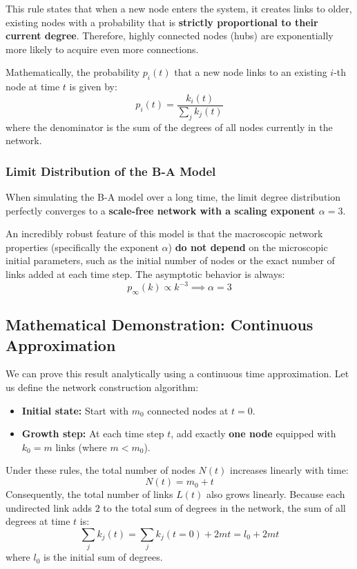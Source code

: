 This rule states that when a new node enters the system, it creates links to older, existing nodes with a probability that is \textbf{strictly proportional to their current degree}. Therefore, highly connected nodes (hubs) are exponentially more likely to acquire even more connections.

Mathematically, the probability \( p_i(t) \) that a new node links to an existing \( i \)-th node at time \( t \) is given by:
\[
    p_i(t) = \frac{k_i(t)}{\sum_j k_j(t)}
\]
where the denominator is the sum of the degrees of all nodes currently in the network.

\subsubsection{Limit Distribution of the B-A Model}

When simulating the B-A model over a long time, the limit degree distribution perfectly converges to a \textbf{scale-free network with a scaling exponent \( \alpha = 3 \)}.

An incredibly robust feature of this model is that the macroscopic network properties (specifically the exponent \( \alpha \)) \textbf{do not depend} on the microscopic initial parameters, such as the initial number of nodes or the exact number of links added at each time step. The asymptotic behavior is always:
\[
    p_\infty(k) \propto k^{-3} \implies \alpha = 3
\]

\subsection{Mathematical Demonstration: Continuous Approximation}

We can prove this result analytically using a continuous time approximation. Let us define the network construction algorithm:
\begin{itemize}
    \item \textbf{Initial state:} Start with \( m_0 \) connected nodes at \( t = 0 \).
    \item \textbf{Growth step:} At each time step \( t \), add exactly \textbf{one node} equipped with \( k_0 = m \) links (where \( m < m_0 \)).
\end{itemize}

Under these rules, the total number of nodes \( N(t) \) increases linearly with time:
\[
    N(t) = m_0 + t
\]
Consequently, the total number of links \( L(t) \) also grows linearly. Because each undirected link adds \( 2 \) to the total sum of degrees in the network, the sum of all degrees at time \( t \) is:
\[
    \sum_j k_j(t) = \sum_j k_j(t=0) + 2mt = l_0 + 2mt
\]
where \( l_0 \) is the initial sum of degrees.

